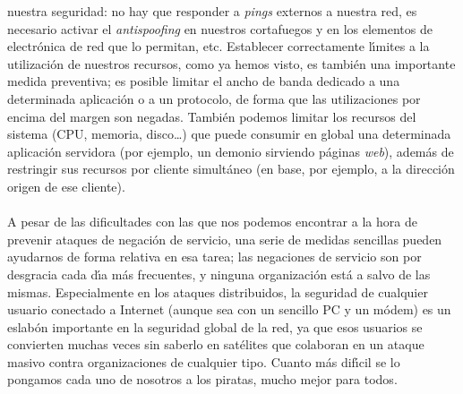 nuestra seguridad: no hay que responder a {\it pings} externos a nuestra red, es
necesario activar el {\it antispoofing} en nuestros cortafuegos y en los 
elementos de electr\'onica de red que lo permitan, etc. Establecer 
correctamente l\'{\i}mites a la utilizaci\'on de nuestros recursos, como ya 
hemos visto, es tambi\'en una importante medida preventiva; es posible limitar
el ancho de banda dedicado a una determinada aplicaci\'on o a un protocolo, de
forma que las utilizaciones por encima del margen son negadas. Tambi\'en 
podemos limitar los recursos del sistema (CPU, memoria, disco\ldots) que puede
consumir en global una determinada aplicaci\'on servidora (por ejemplo, un
demonio sirviendo p\'aginas {\it web}), adem\'as de restringir sus recursos por
cliente simult\'aneo (en base, por ejemplo, a la direcci\'on origen de ese
cliente).\\
\\A pesar de las dificultades con las que nos podemos encontrar a la hora de
prevenir ataques de negaci\'on de servicio, una serie de medidas sencillas 
pueden ayudarnos de forma relativa en esa tarea; las negaciones de servicio son
por desgracia cada d\'{\i}a m\'as frecuentes, y ninguna organizaci\'on est\'a
a salvo de las mismas. Especialmente en los ataques distribuidos, la seguridad
de cualquier usuario conectado a Internet (aunque sea con un sencillo PC y un
m\'odem) es un eslab\'on importante en la seguridad global de la red, ya que 
esos usuarios se convierten muchas veces sin saberlo en sat\'elites que 
colaboran en un ataque masivo contra organizaciones de cualquier tipo. Cuanto
m\'as dif\'{\i}cil se lo pongamos cada uno de nosotros a los piratas, mucho
mejor para todos.
